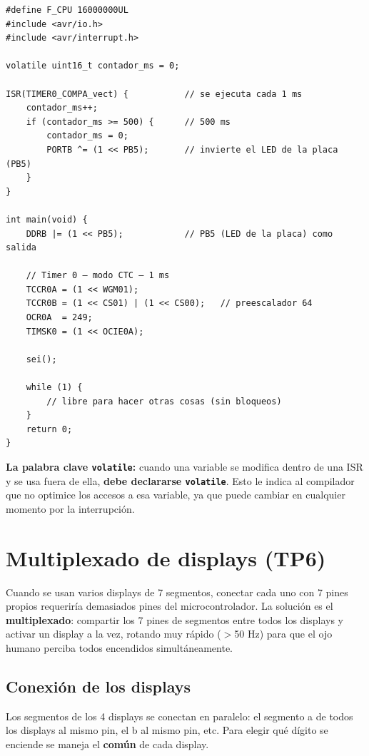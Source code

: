 \begin{lstlisting}[style=estilo-c]
#define F_CPU 16000000UL
#include <avr/io.h>
#include <avr/interrupt.h>

volatile uint16_t contador_ms = 0;

ISR(TIMER0_COMPA_vect) {           // se ejecuta cada 1 ms
    contador_ms++;
    if (contador_ms >= 500) {      // 500 ms
        contador_ms = 0;
        PORTB ^= (1 << PB5);       // invierte el LED de la placa (PB5)
    }
}

int main(void) {
    DDRB |= (1 << PB5);            // PB5 (LED de la placa) como salida

    // Timer 0 — modo CTC — 1 ms
    TCCR0A = (1 << WGM01);
    TCCR0B = (1 << CS01) | (1 << CS00);   // preescalador 64
    OCR0A  = 249;
    TIMSK0 = (1 << OCIE0A);

    sei();

    while (1) {
        // libre para hacer otras cosas (sin bloqueos)
    }
    return 0;
}
\end{lstlisting}

\begin{notabox}
\textbf{La palabra clave \texttt{volatile}:} cuando una variable se modifica dentro
de una ISR y se usa fuera de ella, \textbf{debe declararse \texttt{volatile}}. Esto
le indica al compilador que no optimice los accesos a esa variable, ya que puede
cambiar en cualquier momento por la interrupción.
\end{notabox}

\section{Multiplexado de displays (TP6)}

Cuando se usan varios displays de 7 segmentos, conectar cada uno con 7 pines propios
requeriría demasiados pines del microcontrolador. La solución es el
\textbf{multiplexado}: compartir los 7 pines de segmentos entre todos los displays y
activar un display a la vez, rotando muy rápido ($>$50 Hz) para que el ojo humano
perciba todos encendidos simultáneamente.

\subsection{Conexión de los displays}

Los segmentos de los 4 displays se conectan en paralelo: el segmento a de todos los
displays al mismo pin, el b al mismo pin, etc. Para elegir qué dígito se enciende se
maneja el \textbf{común} de cada display.

